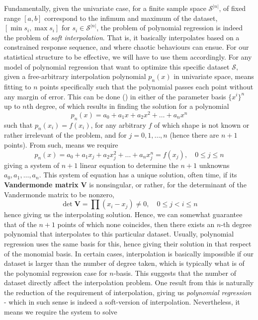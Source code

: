 \documentclass[10pt]{article}
\begin{document}
Fundamentally, given the univariate case, for a finite sample space $\mathcal{S}^{\lvert n\rvert}$, of fixed range $[a,b]$ correspond to the infimum and maximum of the dataset, $[\min s_{i},\max s_{i}]$ for $s_{i}\in \mathcal{S}^{\lvert n\rvert}$, the problem of polynomial regression is indeed the problem of \textit{soft interpolation}. That is, it basically interpolates based on a constrained response sequence, and where chaotic behaviours can ensue. For our statistical structure to be effective, we will have to use them accordingly. For any model of polynomial regression that want to optimize this specific dataset $\mathcal{S}$, given a free-arbitrary interpolation polynomial $p_{n}(x)$ in univariate space, means fitting to $n$ points specifically such that the polynomial passes each point without any margin of error. This can be done (\cite{McArtneyInterpolation2003}) in either of the parameter basis $\{x^{i}\}^{n}$ up to $n$th degree, of which results in finding the solution for a polynomial 
\begin{equation}
    p_{n}(x) = a_{0} + a_{1} x + a_{2} x^{2} + \dots + a_{n}x^{n} 
\end{equation}
such that $p_{n}(x_{i})=f(x_{i})$, for any arbitrary $f$ of which shape is not known or rather irrelevant of the problem, and for $j=0,1,\dots,n$ (hence there are $n+1$ points). From such, means we require 
\begin{equation}
    p_{n}(x) = a_{0} + a_{1} x_{j} + a_{2} x^{2}_{j} + \dots + a_{n}x^{n}_{j} = f(x_{j}), \quad 0 \leq j \leq n 
\end{equation}
giving a system of $n+1$ linear equation to determine the $n+1$ unknowns $a_{0},a_{1},\dots,a_{n}$. This system of equation has a unique solution, often time, if its \textbf{Vandermonde matrix} $\mathbf{V}$ is nonsingular, or rather, for the determinant of the Vandermonde matrix to be nonzero, \begin{equation}
    \det{\mathbf{V}} = \prod (x_{i}-x_{j}) \ne 0 , \quad 0 \leq j < i \leq n 
\end{equation}
hence giving us the interpolating solution. Hence, we can somewhat guarantee that of the $n+1$ points of which none coincides, then there exists an $n$-th degree polynomial that interpolates to this particular dataset. Usually, polynomial regression uses the same basis for this, hence giving their solution in that respect of the monomial basis. In certain cases, interpolation is basically impossible if our dataset is larger than the number of degree taken, which is typically what is of the polynomial regression case for $n$-basis. This suggests that the number of dataset directly affect the interpolation problem. One result from this is naturally the reduction of the requirement of interpolation, giving us \textit{polynomial regression} - which in such sense is indeed a soft-version of interpolation. Nevertheless, it means we require the system to solve 
\end{document}
